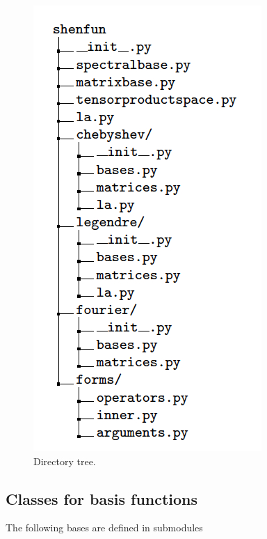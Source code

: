 \documentclass[%
oneside,                 %
final,                   %
10pt]{article}
\theoremstyle{definition}
\begin{document}
\begin{figure}[!ht]  %
  \centerline{\includegraphics[width=0.5\linewidth]{figs/dirtree.png}}
  \caption{
  Directory tree. \label{fig:directorytree}
  }
\end{figure}


\subsection{Classes for basis functions}

The following bases are defined in submodules
\end{document}
